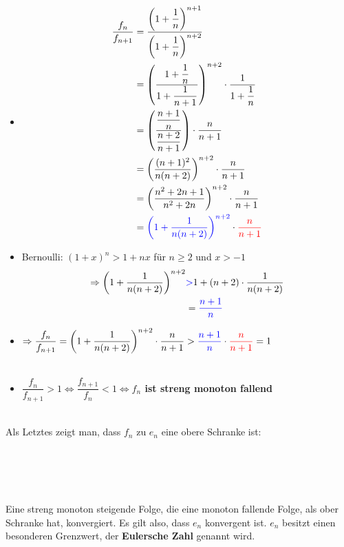 \documentclass[main.tex]{subfiles}
\begin{document}
\begin{itemize}
\item\begin{align*}\dfrac{f_{n}}{f_{n+1}}&=\dfrac{\left(1+\dfrac{1}{n}\right)^{n+1}}{\left(1+\dfrac{1}{n}\right)^{n+2}}\\
&=\left(\dfrac{1+\dfrac{1}{n}}{1+\dfrac{1}{n+1}}\right)^{n+2}\cdot\dfrac{1}{1+\dfrac{1}{n}}\\
&=\left(\dfrac{\dfrac{n+1}{n}}{\dfrac{n+2}{n+1}}\right)\cdot\dfrac{n}{n+1}\\
&=\left(\dfrac{(n+1)^2}{n(n+2)}\right)^{n+2}\cdot\dfrac{n}{n+1}\\
&=\left(\dfrac{n^2+2n+1}{n^2+2n}\right)^{n+2}\cdot\dfrac{n}{n+1}\\
&=\textcolor{blue}{\left(1+\dfrac{1}{n(n+2)}\right)^{n+2}}\cdot\textcolor{red}{\dfrac{n}{n+1}}
\end{align*}

\item Bernoulli: $(1+x)^n>1+nx$ für $n\geq2$ und $x>-1$\\
\begin{align*}\Rightarrow\left(1+\dfrac{1}{n(n+2)}\right)^{n+2}&\textcolor{blue}{>}1+(n+2)\cdot\dfrac{1}{n(n+2)}\\
&=\textcolor{blue}{\dfrac{n+1}{n}}
\end{align*}

\item$\Rightarrow\dfrac{f_n}{f_{n+1}}=\left(1+\dfrac{1}{n(n+2)}\right)^{n+2}\cdot\dfrac{n}{n+1}>\textcolor{blue}{\dfrac{n+1}{n}}\cdot\textcolor{red}{\dfrac{n}{n+1}}=1$
\\\\
\item $\dfrac{f_n}{f_{n+1}}>1\Leftrightarrow\dfrac{f_{n+1}}{f_{n}}<1$\textbf{$\Leftrightarrow f_n$ ist streng monoton fallend}
\\\\
\end{itemize}
Als Letztes zeigt man, dass $f_n$ zu $e_n$ eine obere Schranke ist:\\\\
\begin{array}{rccc}
&\left(1+\right)^{n+1}&>&\left(1+\right)^n}\\
\Leftrightarrow&f_n&>&e_n
\end{array}
\\\\\\
Eine streng monoton steigende Folge, die eine monoton fallende Folge, als ober Schranke hat, konvergiert. Es gilt also, dass $e_n$ konvergent ist. $e_n$ besitzt einen besonderen Grenzwert, der \textbf{Eulersche Zahl} genannt wird.
\newpage
\end{document}
